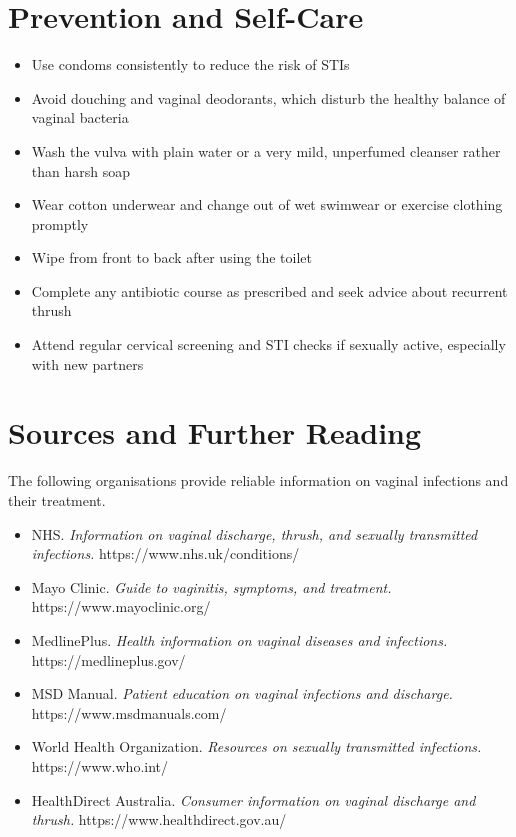 \section*{Prevention and Self-Care}
\begin{itemize}
    \item Use condoms consistently to reduce the risk of STIs
    \item Avoid douching and vaginal deodorants, which disturb the healthy balance of vaginal bacteria
    \item Wash the vulva with plain water or a very mild, unperfumed cleanser rather than harsh soap
    \item Wear cotton underwear and change out of wet swimwear or exercise clothing promptly
    \item Wipe from front to back after using the toilet
    \item Complete any antibiotic course as prescribed and seek advice about recurrent thrush
    \item Attend regular cervical screening and STI checks if sexually active, especially with new partners
\end{itemize}

\section*{Sources and Further Reading}
The following organisations provide reliable information on vaginal infections and their treatment.

\begin{itemize}
    \item NHS. \textit{Information on vaginal discharge, thrush, and sexually transmitted infections.} https://www.nhs.uk/conditions/
    \item Mayo Clinic. \textit{Guide to vaginitis, symptoms, and treatment.} https://www.mayoclinic.org/
    \item MedlinePlus. \textit{Health information on vaginal diseases and infections.} https://medlineplus.gov/
    \item MSD Manual. \textit{Patient education on vaginal infections and discharge.} https://www.msdmanuals.com/
    \item World Health Organization. \textit{Resources on sexually transmitted infections.} https://www.who.int/
    \item HealthDirect Australia. \textit{Consumer information on vaginal discharge and thrush.} https://www.healthdirect.gov.au/
\end{itemize}
